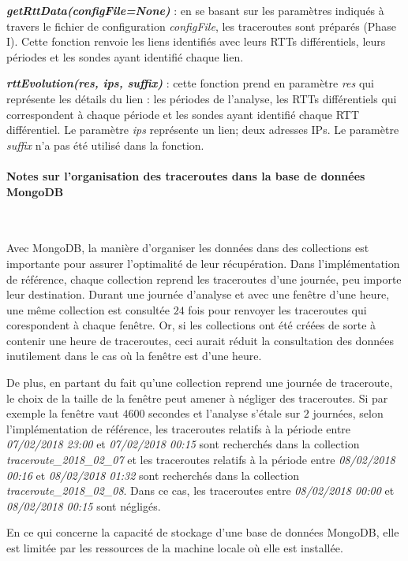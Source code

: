 \textit{\textbf{getRttData(configFile=None)}} : en se basant sur les paramètres indiqués à travers le fichier de configuration \textit{configFile}, les traceroutes sont préparés (Phase I). Cette fonction renvoie les liens identifiés avec leurs RTTs différentiels, leurs périodes et les sondes ayant identifié chaque lien.

\textit{\textbf{rttEvolution(res, ips, suffix)}} : cette fonction prend en paramètre \textit{res} qui représente les détails du lien : les périodes de l'analyse, les RTTs différentiels qui correspondent à chaque période et les sondes ayant identifié chaque RTT différentiel. Le paramètre \textit{ips} représente un lien;  deux adresses IPs. Le paramètre \textit{suffix} n'a pas été utilisé dans la fonction.


\paragraph{Notes sur l'organisation des traceroutes dans la base de données MongoDB}~

Avec MongoDB,  la manière d'organiser les données dans des collections est importante pour assurer l'optimalité de leur récupération. Dans l'implémentation de référence, chaque collection reprend les traceroutes d'une journée, peu importe leur destination. Durant  une journée d'analyse et avec une fenêtre d'une heure,  une même collection est consultée $24$ fois pour renvoyer les traceroutes qui corespondent à chaque fenêtre.   Or, si les collections ont été créées de sorte à contenir une heure de traceroutes, ceci aurait réduit la consultation des données inutilement dans le cas où la fenêtre est d'une heure. 

De plus, en partant du fait qu'une collection reprend une journée de traceroute, le choix de la taille de la fenêtre peut amener à négliger des traceroutes. Si par exemple la fenêtre vaut   $ 4600 $ secondes et l'analyse s'étale sur $2$ journées, selon l'implémentation de référence, les traceroutes relatifs à la période entre  \textit{07/02/2018 23:00} et \textit{07/02/2018 00:15}   sont recherchés dans la collection  \textit{traceroute\_2018\_02\_07} et les traceroutes 
relatifs à la période entre \textit{08/02/2018 00:16} et \textit{08/02/2018 01:32}  sont recherchés dans la collection \textit{traceroute\_2018\_02\_08}. Dans ce cas, les traceroutes entre \textit{08/02/2018 00:00} et \textit{08/02/2018 00:15} sont négligés.

En ce qui concerne la capacité de  stockage d'une base de données MongoDB,  elle est limitée par les ressources de la machine locale où elle est installée. 



